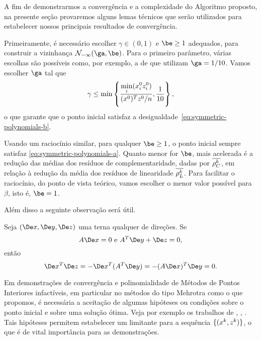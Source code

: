 A fim de demonstrarmos a convergência e a complexidade do Algoritmo proposto, na presente seção provaremos alguns lemas técnicos que serão utilizados para estabelecer nossos principais resultados de convergência. 

Primeiramente, é necessário  escolher  $\gamma\in(0,1)$  e $\be\geq 1$ adequados, para construir a vizinhança $\Nset_{-\infty}(\ga,\be)$. Para o primeiro parâmetro, várias escolhas são possíveis como, por exemplo, a de 
\textcite{Colombo:2008ia} que utilizam $\ga = 1/10$. Vamos escolher $\ga$ tal que  
\[
\gamma \leq  \min\left\{ \frac{\displaystyle \min_{i}(x^0_{i} z^0_{i} )}{(x^0 )^Tz^0 /n}, \frac{1}{10}\right\},
\]
o que garante que o ponto inicial satisfaz a desigualdade~\eqref{eq:symmetric-polynomials-b}.

Usando um raciocínio similar, para qualquer  $\be\geq 1$, o ponto inicial sempre satisfaz \eqref{eq:symmetric-polynomials-a}. Quanto menor for $\be$, mais acelerada é a redução  das médias dos resíduos de complementaridade, dadas por $\overline{\rho_C^{k}} $, em relação à redução da média dos resíduos de linearidade $\overline{\rho_L^{k}}$. Para facilitar o raciocínio, do ponto de vista teórico, vamos escolher o menor valor possível para $\beta$, isto é, $\be=1$.

Além disso a seguinte observação será  útil.


\begin{obs}
	Seja  $(\Dex,\Dey,\Dez)$ uma terna qualquer de direções. Se 
\begin{equation}
	\label{eq:Ax0-ATyz0}
	A\Dex=0 \text{ e } A^T\Dey + \Dez = 0,
\end{equation}
então
\begin{equation}
	\label{eq:xTziszero}
	\Dex^T\Dez =  - \Dex^T(A^T\Dey)  = -(A\Dex)^T\Dey = 0.
\end{equation}
\end{obs}



Em demonstrações de convergência e polinomialidade de Métodos de Pontos Interiores  infactíveis, em particular no métodos do tipo Mehrotra como o que propomos,  é  necessária a aceitação de algumas hipóteses ou condições sobre o ponto inicial e  sobre uma solução ótima. Veja por exemplo os trabalhos de \textcite{Wright:1994jd}, \textcite[cap. 6]{Wright:Primal-dual-interior-point:1997h}, \textcite{Wright:1996kj,Zhang:2006ic,Zhang:1994fz,Zhang:1995fu}. Tais hipóteses permitem estabelecer um limitante para a sequência $\{(x^{k},z^{k})\}$, o que é de vital importância para as demonstrações.

